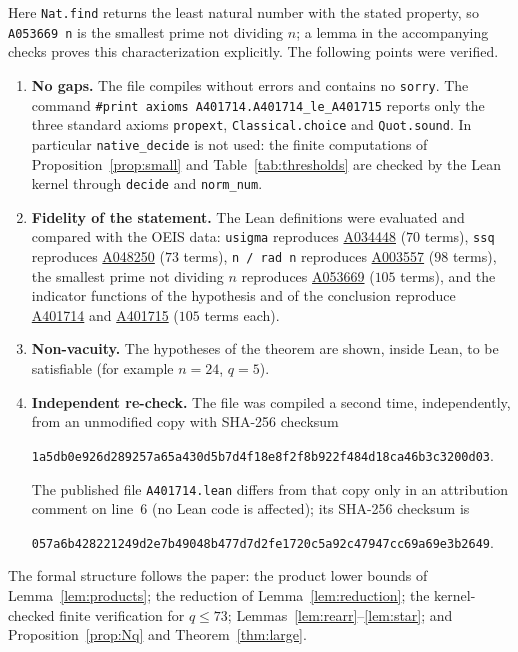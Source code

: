 \documentclass[11pt,a4paper]{amsart}
\theoremstyle{definition}
\theoremstyle{remark}
\newcommand{\oeis}[1]{\href{https://oeis.org/#1}{#1}}
\begin{document}
\noindent Here \texttt{Nat.find} returns the least natural number with the stated property, so \texttt{A053669 n} is the smallest prime not dividing $n$; a lemma in the accompanying checks proves this characterization explicitly. The following points were verified.
\begin{enumerate}[leftmargin=2em]
  \item \textbf{No gaps.} The file compiles without errors and contains no \texttt{sorry}. The command \texttt{\#print axioms A401714.A401714\_le\_A401715} reports only the three standard axioms \texttt{propext}, \texttt{Classical.choice} and \texttt{Quot.sound}. In particular \texttt{native\_decide} is not used: the finite computations of Proposition~\ref{prop:small} and Table~\ref{tab:thresholds} are checked by the Lean kernel through \texttt{decide} and \texttt{norm\_num}.
  \item \textbf{Fidelity of the statement.} The Lean definitions were evaluated and compared with the OEIS data: \texttt{usigma} reproduces \oeis{A034448} ($70$ terms), \texttt{ssq} reproduces \oeis{A048250} ($73$ terms), \texttt{n / rad n} reproduces \oeis{A003557} ($98$ terms), the smallest prime not dividing $n$ reproduces \oeis{A053669} ($105$ terms), and the indicator functions of the hypothesis and of the conclusion reproduce \oeis{A401714} and \oeis{A401715} ($105$ terms each).
  \item \textbf{Non-vacuity.} The hypotheses of the theorem are shown, inside Lean, to be satisfiable (for example $n=24$, $q=5$).
  \item \textbf{Independent re-check.} The file was compiled a second time, independently, from an unmodified copy with SHA-256 checksum
  \begin{center}\footnotesize\texttt{1a5db0e926d289257a65a430d5b7d4f18e8f2f8b922f484d18ca46b3c3200d03}.\end{center}
  The published file \texttt{A401714.lean} differs from that copy only in an attribution comment on line~6 (no Lean code is affected); its SHA-256 checksum is
  \begin{center}\footnotesize\texttt{057a6b428221249d2e7b49048b477d7d2fe1720c5a92c47947cc69a69e3b2649}.\end{center}
\end{enumerate}
The formal structure follows the paper: the product lower bounds of Lemma~\ref{lem:products}; the reduction of Lemma~\ref{lem:reduction}; the kernel-checked finite verification for $q\le73$; Lemmas~\ref{lem:rearr}--\ref{lem:star}; and Proposition~\ref{prop:Nq} and Theorem~\ref{thm:large}.
\end{document}
